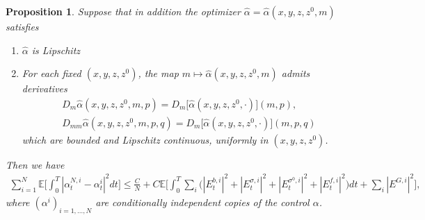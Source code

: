 \documentclass[11pt,reqno]{amsart}
\numberwithin{equation}{section}
\newtheorem{proposition}[theorem]{Proposition}
\theoremstyle{definition}
\def\E{{\mathbb E}}
\def \E{\mathbb{E}}
\begin{document}
\begin{proposition}
Suppose that in addition the optimizer $\hat{\alpha} = \widehat{\alpha}(x,y,z,z^0,m)$ satisfies
\begin{enumerate}
\item $\hat{\alpha}$ is Lipschitz
\item For each fixed $(x,y,z,z^0)$, the map $m \mapsto \widehat{\alpha}(x,y,z,z^0,m)$ admits derivatives 
\begin{align*}
D_m \widehat{\alpha}(x,y,z,z^0,m,p) = D_m\big[\widehat{\alpha}(x,y,z,z^0, \cdot)](m,p), \\
 D_{mm} \widehat{\alpha}(x,y,z,z^0,m,p,q) = D_m\big[\widehat{\alpha}(x,y,z,z^0, \cdot)](m,p,q)
\end{align*}
which are bounded and Lipschitz continuous, uniformly in $(x,y,z,z^0)$.
\end{enumerate}
Then we have 
\begin{align*}
\sum_{ i = 1}^N \E\bigg[\int_0^T | \alpha_t^{N,i} - \alpha^i_t|^2 dt \bigg] \leq \frac{C}{N} + C \E \bigg[ \int_0^T  \sum_i \Big(|E_t^{b,i}|^2 + |E_t^{\sigma,i}|^2 + |E_t^{\sigma^0,i}|^2  + |E_t^{f,i}|^2 \Big) dt  +  \sum_i |E^{G,i}|^2 \bigg], 
\end{align*}
where 
$(\alpha^i)_{i = 1,\dots,N}$ are conditionally independent copies of the control $\alpha$.
\end{proposition}
\end{document}
